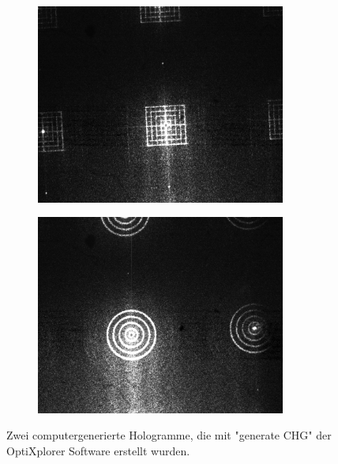\begin{figure}[h]
	\begin{subfigure}[c]{0.5\textwidth}
		\includegraphics[width=0.9\textwidth]{Holo1.png}
		
	\end{subfigure}
	\begin{subfigure}[c]{0.5\textwidth}
		\includegraphics[width=0.9\textwidth]{Holo2.png}
	\end{subfigure}
	\caption{Zwei computergenerierte Hologramme, die mit "generate CHG" der OptiXplorer Software erstellt wurden.}
	\label{hologram}
\end{figure}

